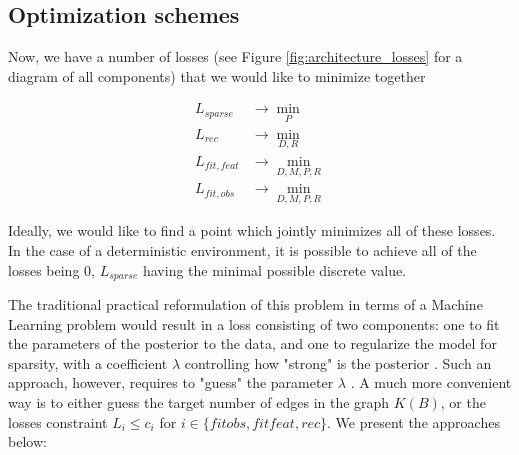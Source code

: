 \documentclass[a4paper,11pt,oneside]{report}
\begin{document}
\subsection{Optimization schemes}
Now, we have a number of losses (see Figure \ref{fig:architecture_losses} for a diagram of all components) that we would like to minimize together

\begin{equation}
\label{eq:all_losses}
\begin{array}{lc}
L_{sparse}&\to\min\limits_P\\
L_{rec}&\to\min\limits_{D,R}\\
L_{fit, feat}&\to\min\limits_{D,M,P,R}\\
L_{fit, obs}&\to\min\limits_{D,M,P,R}
\end{array}
\end{equation}

Ideally, we would like to find a point which jointly minimizes all of these losses. In the case of a deterministic environment, it is possible to achieve all of the losses being $0$, $L_{sparse}$ having the minimal possible discrete value.

The traditional practical reformulation of this problem in terms of a Machine Learning problem would result in a loss consisting of two components: one to fit the parameters of the posterior to the data, and one to regularize the model for sparsity, with a coefficient $\lambda$ controlling how "strong" is the posterior \cite{Seeger2007}.
Such an approach, however, requires to "guess" the parameter $\lambda$ \cite{Luneau2020,Wang2020}.
A much more convenient way is to either guess the target number of edges in the graph $K(B)$, or the losses constraint $L_i\leq c_i$ for $i\in\{fitobs, fitfeat, rec\}$.
We present the approaches below:
\end{document}
